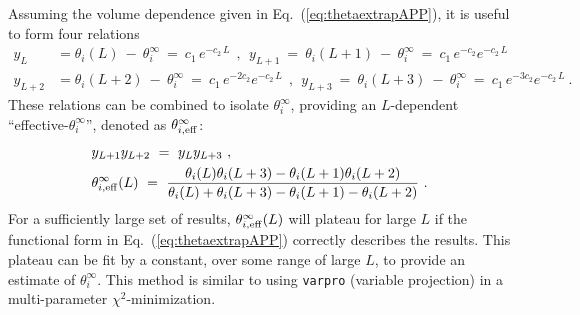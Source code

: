 \documentclass[aps, pra, onecolumn, tightenlines, letterpaper, amsmath, amssymb, preprintnumbers, floatfix, longbibliography, nofootinbib]{revtex4-2}
\begin{document}
Assuming the volume dependence given in Eq.~(\ref{eq:thetaextrapAPP}),
it is useful to form four relations
%
\begin{align}
y_L & = \theta_i(L) \ - \ \theta_i^{\infty}\ = \ c_1\,e^{-c_2 \, L} 
\ \ ,\ \ 
y_{L+1}\ =\ \theta_i(L+1) \ - \ \theta_i^{\infty}\ = \ c_1\, e^{-c_2} e^{-c_2 \, L} 
\nonumber \\
y_{L+2} & = \theta_i(L+2) \ - \ \theta_i^{\infty}\ = \ c_1\, e^{-2 c_2} e^{-c_2 \, L} 
\ \ ,\ \ 
y_{L+3}\ =\ \theta_i(L+3) \ - \ \theta_i^{\infty}\ = \ c_1\,e^{-3 c_2} e^{-c_2 \, L} 
\ .
\label{eq:LdifsA}
\end{align}
%
These relations can be combined to isolate $\theta_i^{\infty}$, providing an $L$-dependent ``effective-$\theta_i^{\infty}$'', denoted as $\theta_{i, {\rm eff}}^{\infty}$:
%
\begin{align}
& y_{L+1} y_{L+2} \  =\  y_{L}  y_{L+3} \ ,
\nonumber \\
& \theta_{i, {\rm eff}}^{\infty}(L) \  =\  
\frac{\theta_i(L) \theta_i(L+3) - \theta_i(L+1)\theta_i(L+2)}{
\theta_i(L) + \theta_i(L+3) - \theta_i(L+1) - \theta_i(L+2)
}
\ .
\label{eq:LdifsB}
\end{align}
%
For a sufficiently large set of results, 
$\theta_{i, {\rm eff}}^{\infty}(L)$ 
will plateau for large $L$ if the functional form in 
Eq.~(\ref{eq:thetaextrapAPP}) correctly describes the results.
This plateau can be fit by a constant,
over some range of large $L$,
to provide an estimate of $\theta_i^{\infty}$.
This method is similar to using {\tt varpro} (variable projection) in a multi-parameter 
$\chi^2$-minimization.
\end{document}
